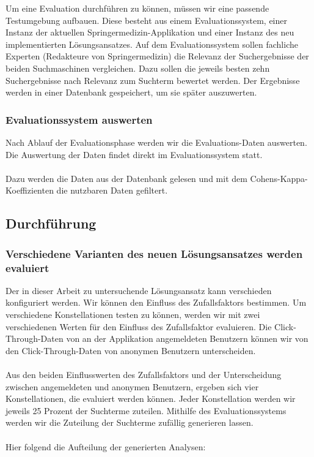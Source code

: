 Um eine Evaluation durchführen zu können, müssen wir eine passende Testumgebung aufbauen. Diese besteht aus einem Evaluationssystem, einer Instanz der aktuellen Springermedizin-Applikation und einer Instanz des neu implementierten Lösungsansatzes. Auf dem Evaluationssystem sollen fachliche Experten (Redakteure von Springermedizin) die Relevanz der Suchergebnisse  der beiden Suchmaschinen vergleichen. Dazu sollen die jeweils besten zehn Suchergebnisse nach Relevanz zum Suchterm bewertet werden. Der Ergebnisse werden in einer Datenbank gespeichert, um sie später auszuwerten. 

\subsubsection{Evaluationssystem auswerten}
\label{sec:Evaluation:Aufbau:Vorgehen:Auswerten}

Nach Ablauf der Evaluationsphase werden wir die Evaluations-Daten auswerten. Die Auswertung der Daten findet direkt im Evaluationssystem statt. 
\\
\\
Dazu werden die Daten aus der Datenbank gelesen und mit dem Cohens-Kappa-Koeffizienten die nutzbaren Daten gefiltert. 

\subsection{Durchführung}
\label{sec:Evaluation:Aufbau:Durchfuehrung}

\subsubsection{Verschiedene Varianten des neuen Lösungsansatzes werden evaluiert}
\label{sec:Evaluation:Aufbau:Durchfuehrung:EvaluationsdatenVarianteLoesungsansatzes}

Der in dieser Arbeit zu untersuchende Lösungsansatz kann verschieden konfiguriert werden. Wir können den Einfluss des Zufallsfaktors bestimmen. Um verschiedene Konstellationen testen zu können, werden wir mit zwei verschiedenen Werten für den Einfluss des Zufallsfaktor evaluieren. Die Click-Through-Daten von an der Applikation angemeldeten Benutzern können wir von den Click-Through-Daten von anonymen Benutzern unterscheiden.
\\
\\
Aus den beiden Einflusswerten des Zufallsfaktors und der Unterscheidung zwischen angemeldeten und anonymen Benutzern, ergeben sich vier Konstellationen, die evaluiert werden können. Jeder Konstellation werden wir jeweils 25 Prozent der Suchterme zuteilen. Mithilfe des Evaluationssystems werden wir die Zuteilung der Suchterme zufällig generieren lassen.
\\
\\
Hier folgend die Aufteilung der generierten Analysen:

